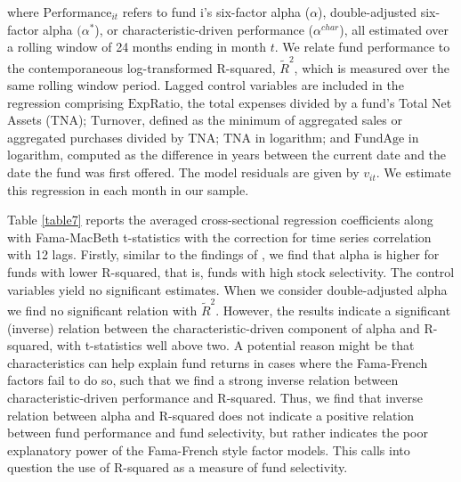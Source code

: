  where $\text{Performance}_{it}$ refers to fund i's six-factor alpha ($\alpha$), double-adjusted six-factor alpha $(\alpha^{*}$),
or characteristic-driven performance ($\alpha^{char}$), all estimated over a rolling window of 24 months ending in month $t$. We relate fund performance to the contemporaneous log-transformed R-squared, $\tilde{R}^2$, which is measured over the same rolling window period. Lagged control variables are included in the regression comprising $\text{ExpRatio}$, the total expenses divided by a fund's Total Net Assets (TNA); $\text{Turnover}$, defined as the minimum of aggregated sales or aggregated purchases divided by TNA; $\text{TNA}$ in logarithm; and $\text{FundAge}$ in logarithm, computed as the difference in years between the current date and the date the fund was first offered. The model residuals are given by $v_{it}$. We estimate this regression in each month in our sample.
\par Table \ref{table7} reports the averaged cross-sectional regression coefficients along with Fama-MacBeth t-statistics with the \citet{newey1986simple} correction for time series correlation with 12 lags. Firstly, similar to the findings of \citet{amihud2013mutual}, we find that alpha is higher for funds with lower R-squared, that is, funds with high stock selectivity. The control variables yield no significant estimates. When we consider double-adjusted alpha we find no significant relation with $\tilde{R}^2$. However, the results indicate a significant (inverse) relation between the characteristic-driven component of alpha and R-squared, with t-statistics well above two. A potential reason might be that characteristics can help explain fund returns in cases where the Fama-French factors fail to do so, such that we find a strong inverse relation between characteristic-driven performance and R-squared. Thus, we find that inverse relation between alpha and R-squared does not indicate a positive relation between fund performance and fund selectivity, but rather indicates the poor explanatory power of the Fama-French style factor models. This calls into question the use of R-squared as a measure of fund selectivity. 


